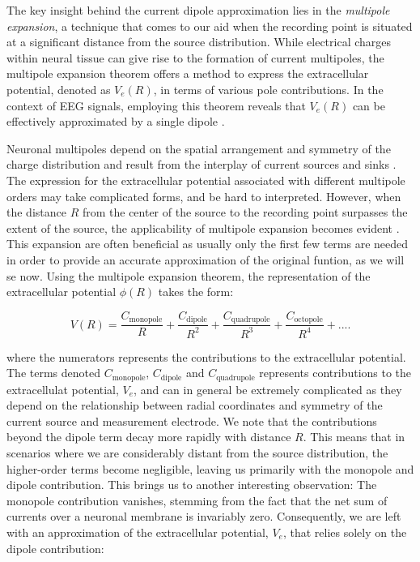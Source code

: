 \documentclass[a4paper, UKenglish, 11pt]{uiomaster}
\begin{document}
The key insight behind the current dipole approximation lies in the \emph{multipole expansion}, a technique that comes to our aid when the recording point is situated at a significant distance from the source distribution. While electrical charges within neural tissue can give rise to the formation of current multipoles, the multipole expansion theorem offers a method to express the extracellular potential, denoted as $V_e(R)$, in terms of various pole contributions. In the context of EEG signals, employing this theorem reveals that $V_e(R)$ can be effectively approximated by a single dipole \cite{brainmodel2022}. 

Neuronal multipoles depend on the spatial arrangement and symmetry of the charge distribution and result from the interplay of current sources and sinks \cite{wiki:multipoles}. The expression for the extracellular potential associated with different multipole orders may take complicated forms, and be hard to interpreted. However, when the distance $R$ from the center of the source to the recording point surpasses the extent of the source, the applicability of multipole expansion becomes evident \cite{jackson1999classical} . This expansion are often beneficial as usually only the first few terms are needed in order to provide an accurate approximation of the original funtion, as we will se now. Using the multipole expansion theorem, the representation of the extracellular potential $\phi(R)$ takes the form:

\begin{equation}
  V(R) = \frac{C_{\text{monopole}}}{R} + \frac{C_{\text{dipole}}}{R^2} + \frac{C_{\text{quadrupole}}}{R^3} + \frac{C_{\text{octopole}}}{R^4} + ... .
\label{eq:extracellular_potential}
\end{equation}

where the numerators represents the contributions to the extracellular potential. The terms denoted $C_\text{monopole}$, $C_\text{dipole}$ and $C_\text{quadrupole}$ represents contributions to the extracellulat potential, $V_e$, and can in general be extremely complicated as they depend on the relationship between radial coordinates and symmetry of the current source and measurement electrode. We note that the contributions beyond the dipole term decay more rapidly with distance $R$. This means that in scenarios where we are considerably distant from the source distribution, the higher-order terms become negligible, leaving us primarily with the monopole and dipole contribution. This brings us to another interesting observation: The monopole contribution vanishes, stemming from the fact that the net sum of currents over a neuronal membrane is invariably zero. Consequently, we are left with an approximation of the extracellular potential, $V_e$, that relies solely on the dipole contribution:
\end{document}
